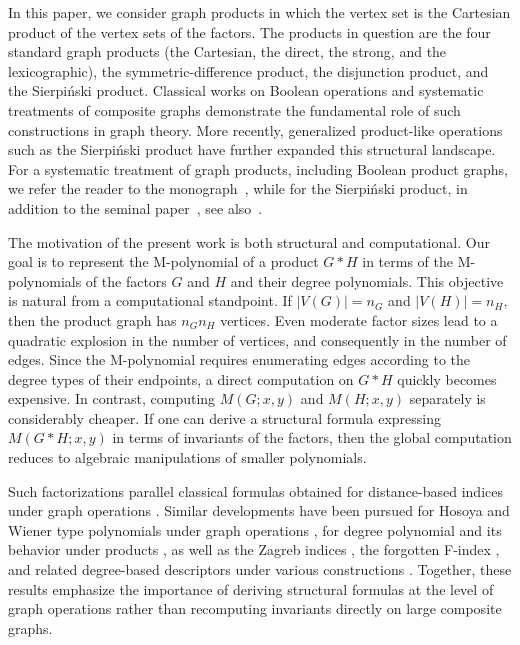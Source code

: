 \documentclass[letterpaper,12pt]{article}
\begin{document}
In this paper, we consider graph products in which the vertex set is the Cartesian product of the vertex sets of the factors. The products in question are the four standard graph products (the Cartesian, the direct, the strong, and the lexicographic), the symmetric-difference product, the disjunction product, and the Sierpi\'{n}ski product. Classical works on Boolean operations
\cite{HararyBOOLEAN}
and systematic treatments of composite graphs
\cite{YEH1994359,STEVANOVIC2001237}
demonstrate the fundamental role of such constructions in graph theory.
More recently, generalized product-like operations such as the
Sierpi\'{n}ski product \cite{KoviSierpinskiProduct}
have further expanded this structural landscape. For a systematic treatment of graph products, including Boolean product graphs, we refer the reader to the monograph~\cite{hammack2011handbook}, while for the Sierpi\'{n}ski product, in addition to the seminal paper~\cite{KoviSierpinskiProduct}, see also~\cite{henning-2024, tian-2025}.

The motivation of the present work is both structural and computational.
Our goal is to represent the M-polynomial of a product
$G \ast H$ in terms of the M-polynomials of the factors $G$ and $H$
and their degree polynomials.
This objective is natural from a computational standpoint.
If $|V(G)| = n_G$ and $|V(H)| = n_H$, then the product graph
has $n_G n_H$ vertices.
Even moderate factor sizes lead to a quadratic explosion in the number
of vertices, and consequently in the number of edges.
Since the M-polynomial requires enumerating edges according to
the degree types of their endpoints, a direct computation on
$G \ast H$ quickly becomes expensive.
In contrast, computing $M(G;x,y)$ and $M(H;x,y)$ separately is
considerably cheaper.
If one can derive a structural formula expressing
$M(G\ast H;x,y)$ in terms of invariants of the factors,
then the global computation reduces to algebraic manipulations
of smaller polynomials.

  
Such factorizations parallel classical formulas obtained for distance-based indices under graph operations \cite{behmaram2011some,YEH1994359,STEVANOVIC2001237,KHALIFEH20081402,HAMZEH20111099}. Similar developments have been pursued for Hosoya and Wiener type polynomials under graph operations \cite{mohamadinezhad2010some}, for degree polynomial  and its behavior under products \cite{Jafarpour2022}, as well as the Zagreb indices \cite{KHALIFEH2009804},  the forgotten F-index \cite{AKHTER201770,Nilanjan2016}, and related degree-based descriptors under various constructions \cite{EmericMploy,Ali_2023,Akhter_2016}. Together, these results emphasize the importance of deriving structural formulas at the level of graph operations rather than recomputing invariants directly on large composite graphs.
\end{document}
